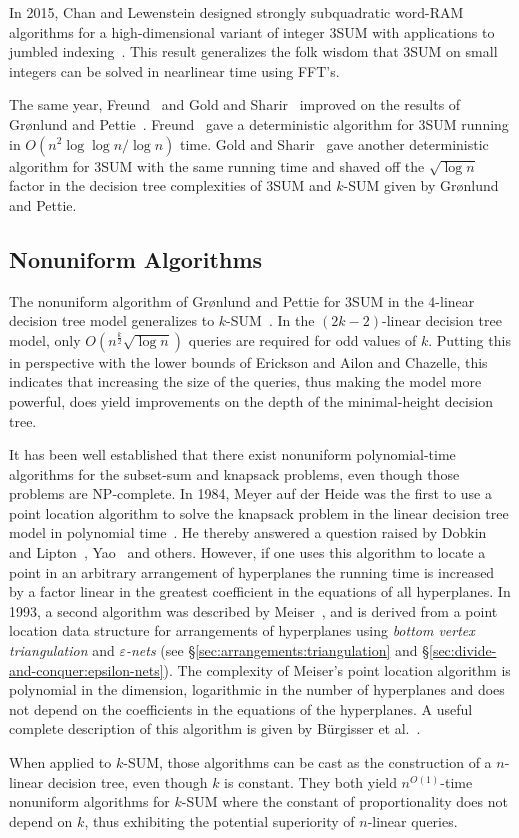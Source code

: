 In 2015, Chan and Lewenstein designed strongly subquadratic word-RAM algorithms
for a high-dimensional variant of integer 3SUM with applications to jumbled
indexing~\cite{CL15}. This result generalizes the folk wisdom that 3SUM on small
integers can be solved in nearlinear time using FFT's.

The same year, Freund~\cite{Fr15} and Gold and Sharir~\cite{GS15}
improved on the results of Gr{\o}nlund and Pettie~\cite{GP18}.
Freund~\cite{Fr15} gave a deterministic algorithm for 3SUM running in \(O(
{n^2\log \log n}/{\log n})\) time. Gold and Sharir~\cite{GS15} gave another
deterministic algorithm for 3SUM with the same running time and shaved off the
$\sqrt{\log n}$ factor in the decision tree complexities of 3SUM and \(k\)-SUM
given by Gr{\o}nlund and Pettie.
%


\subsection{Nonuniform Algorithms}%
\label{sec:history:sum:nonuniform-algorithms}

The nonuniform algorithm of Gr\o nlund and
Pettie for 3SUM in the \(4\)-linear decision tree model
generalizes to \(k\)-SUM~\cite{GP18}.
In the $(2k-2)$-linear decision tree model,
only $O(n^\frac{k}{2}\sqrt{\log n})$ queries are required for odd values of $k$.
Putting this in perspective with the lower bounds of Erickson and Ailon and
Chazelle, this indicates that increasing the size of the queries, thus making
the model more powerful, does yield
improvements on the depth of the minimal-height decision tree.

It has been well established that there exist nonuniform
polynomial-time algorithms for the subset-sum and knapsack problems, even
though those problems are \textsc{NP}-complete.
%
In 1984,
Meyer auf der Heide was the first to use a point location algorithm to solve
the knapsack problem in the linear decision tree model in polynomial time~\cite{M84}.
He
thereby answered a question raised by Dobkin and Lipton~\cite{DL74,DL78},
Yao~\cite{Y82} and others. However, if one uses this algorithm to locate a
point in an arbitrary arrangement of hyperplanes the running time is increased
by a factor linear in the greatest coefficient in the equations of all
hyperplanes.
%
In 1993,
a second algorithm was described by Meiser~\cite{M93}, and is derived from a
point location data structure for arrangements of hyperplanes using
\emph{bottom vertex triangulation} and \emph{\(\varepsilon\)-nets} (see
\S\ref{sec:arrangements:triangulation} and
\S\ref{sec:divide-and-conquer:epsilon-nets}).
%
The complexity of Meiser's point location algorithm is polynomial in the
dimension, logarithmic in the number of hyperplanes and does not depend on the
coefficients in the equations of the hyperplanes. A useful
complete description of this algorithm is given by Bürgisser et
al.~\cite[Section~3.4]{BCS97}.

When applied to \(k\)-SUM, those algorithms can be cast as the construction of
a \(n\)-linear decision tree, even though \(k\) is constant.
They both yield \(n^{O(1)}\)-time nonuniform algorithms for
\(k\)-SUM where the constant of proportionality does not depend on \(k\), thus
exhibiting the potential superiority of $n$-linear queries.
